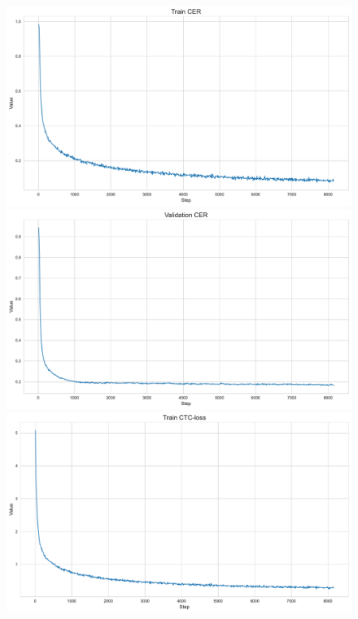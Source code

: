 \documentclass{extarticle}
\begin{document}
\begin{figure}[h!]
	\centering
	\begin{minipage}{0.49\textwidth}
		\centering
		\includegraphics[width=\textwidth]{images/train_cer.pdf}
	\end{minipage}
	\begin{minipage}{0.49\textwidth}
		\centering
		\includegraphics[width=\textwidth]{images/valid_cer.pdf}
	\end{minipage}
	\begin{minipage}{0.49\textwidth}
		\centering
		\includegraphics[width=\textwidth]{images/train_loss.pdf}

\end{minipage}
\end{figure}
\end{document}
